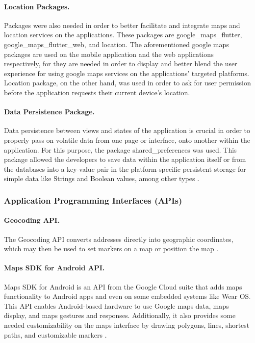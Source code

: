 \paragraph{Location Packages.} Packages were also needed in order to better facilitate and integrate maps and location services on the applications. These packages are google\_maps\_flutter, google\_maps\_flutter\_web, and location. The aforementioned google maps packages are used on the mobile application and the web applications respectively, for they are needed in order to display and better blend the user experience for using google maps services on the applications' targeted platforms. Location package, on the other hand, was used in order to ask for user permission before the application requests their current device's location.

\paragraph{Data Persistence Package.} Data persistence between views and states of the application is crucial in order to properly pass on volatile data from one page or interface, onto another within the application. For this purpose, the package shared\_preferences was used. This package allowed the developers to save data within the application itself or from the databases into a key-value pair in the platform-specific persistent storage for simple data like Strings and Boolean values, among other types \cite{sharedPreferences}.

\subsubsection{Application Programming Interfaces (APIs)}

\paragraph{Geocoding API.} The Geocoding API converts addresses directly into geographic coordinates, which may then be used to set markers on a map or position the map  \cite{geocoding}.

\paragraph{Maps SDK for Android API.} Maps SDK for Android is an API from the Google Cloud suite that adds maps functionality to Android apps and even on some embedded systems like Wear OS. This API enables Android-based hardware to use Google maps data, maps display, and maps gestures and responses. Additionally, it also provides some needed customizability on the maps interface by drawing polygons, lines, shortest paths, and customizable markers \cite{androidSDK}. 

